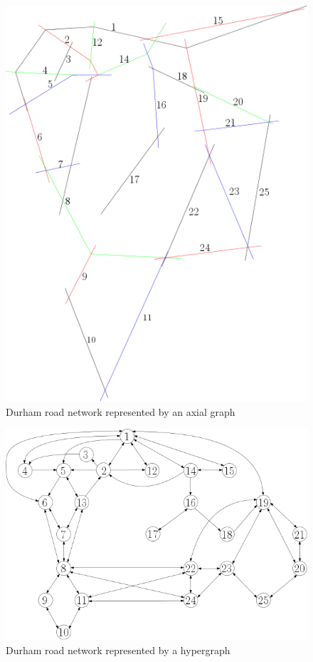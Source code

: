 \documentclass[11pt]{report}
\begin{document}
\begin{figure}[h]
\centering
\includegraphics[width=\linewidth]{axial_colour_label.png}
\caption{Durham road network represented by an axial graph}
\label{durham axial}
\end{figure}

\begin{figure}[h]
\includegraphics[width=\linewidth]{ipe_durham.png}
\caption{Durham road network represented by a hypergraph}
\label{durham graph}
\end{figure}
\end{document}
